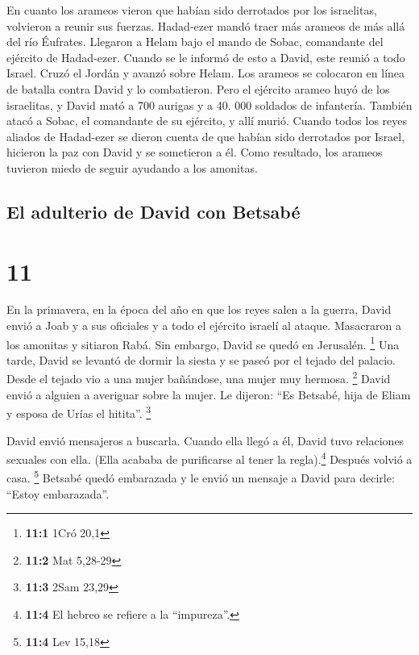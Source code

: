  En cuanto los arameos vieron que habían sido derrotados
por los israelitas, volvieron a reunir sus fuerzas. 
Hadad-ezer mandó traer más arameos de más allá del río Éufrates.
Llegaron a Helam bajo el mando de Sobac, comandante del ejército de
Hadad-ezer.  Cuando se le informó de esto a David, este
reunió a todo Israel. Cruzó el Jordán y avanzó sobre Helam. Los arameos
se colocaron en línea de batalla contra David y lo combatieron.
 Pero el ejército arameo huyó de los israelitas, y David
mató a 700 aurigas y a 40. 000 soldados de infantería. También atacó a
Sobac, el comandante de su ejército, y allí murió. 
Cuando todos los reyes aliados de Hadad-ezer se dieron cuenta de que
habían sido derrotados por Israel, hicieron la paz con David y se
sometieron a él. Como resultado, los arameos tuvieron miedo de seguir
ayudando a los amonitas.

\hypertarget{el-adulterio-de-david-con-betsabuxe9}{%
\subsection{El adulterio de David con
Betsabé}\label{el-adulterio-de-david-con-betsabuxe9}}

\hypertarget{section-10}{%
\section{11}\label{section-10}}

 En la primavera, en la época del año en que los reyes
salen a la guerra, David envió a Joab y a sus oficiales y a todo el
ejército israelí al ataque. Masacraron a los amonitas y sitiaron Rabá.
Sin embargo, David se quedó en Jerusalén. \footnote{\textbf{11:1} 1Cró
  20,1}  Una tarde, David se levantó de dormir la siesta y
se paseó por el tejado del palacio. Desde el tejado vio a una mujer
bañándose, una mujer muy hermosa. \footnote{\textbf{11:2} Mat 5,28-29}
 David envió a alguien a averiguar sobre la mujer. Le
dijeron: ``Es Betsabé, hija de Eliam y esposa de Urías el hitita''.
\footnote{\textbf{11:3} 2Sam 23,29}

 David envió mensajeros a buscarla. Cuando ella llegó a
él, David tuvo relaciones sexuales con ella. (Ella acababa de
purificarse al tener la regla).\footnote{\textbf{11:4} El hebreo se
  refiere a la ``impureza''.} Después volvió a casa. \footnote{\textbf{11:4}
  Lev 15,18}  Betsabé quedó embarazada y le envió un
mensaje a David para decirle: ``Estoy embarazada''.

